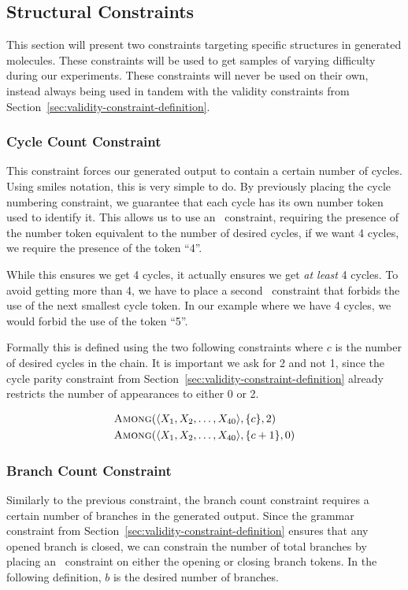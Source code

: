 \documentclass[../Document.tex]{subfiles}
\begin{document}
\subsection{Structural Constraints}
This section will present two constraints targeting specific structures in generated molecules. These constraints will be used to get samples of varying difficulty during our experiments. These constraints will never be used on their own, instead always being used in tandem with the validity constraints from Section~\ref{sec:validity-constraint-definition}.

\subsubsection{Cycle Count Constraint}
This constraint forces our generated output to contain a certain number of cycles. 
Using \gls{smiles} notation, this is very simple to do.
By previously placing the cycle numbering constraint, we guarantee that each cycle has its own number token used to identify it.
This allows us to use an \among\ constraint, requiring the presence of the number token equivalent to the number of desired cycles, \eg if we want 4 cycles, we require the presence of the token ``4''.

While this ensures we get 4 cycles, it actually ensures we get \textit{at least} 4 cycles. To avoid getting more than 4, we have to place a second \among\ constraint that forbids the use of the next smallest cycle token. In our example where we have 4 cycles, we would forbid the use of the token ``5''.

Formally this is defined using the two following constraints where $c$ is the number of desired cycles in the chain. It is important we ask for 2 and not 1, since the cycle parity constraint from Section~\ref{sec:validity-constraint-definition} already restricts the number of appearances to either 0 or 2. 

\begin{align*}
    &\mbox{\sc Among}(\langle X_1, X_2, \ldots, X_{40} \rangle, \{c\}, 2)\\
    &\mbox{\sc Among}(\langle X_1, X_2, \ldots, X_{40} \rangle, \{c+1\}, 0)
\end{align*}


\subsubsection{Branch Count Constraint}
Similarly to the previous constraint, the branch count constraint requires a certain number of branches in the generated output. Since the grammar constraint from Section~\ref{sec:validity-constraint-definition} ensures that any opened branch is closed, we can constrain the number of total branches by placing an \among\ constraint on either the opening or closing branch tokens. In the following definition, $b$ is the desired number of branches.
\end{document}
